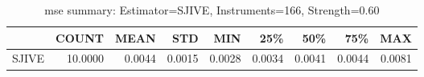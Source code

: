 \begin{table}[ht]
\centering
\caption{mse summary: Estimator=SJIVE, Instruments=166, Strength=0.60}
\begin{tabular}{lrrrrrrrr}
\toprule
 & COUNT & MEAN & STD & MIN & 25\% & 50\% & 75\% & MAX \\
\midrule
SJIVE & 10.0000 & 0.0044 & 0.0015 & 0.0028 & 0.0034 & 0.0041 & 0.0044 & 0.0081 \\
\bottomrule
\end{tabular}
\end{table}

